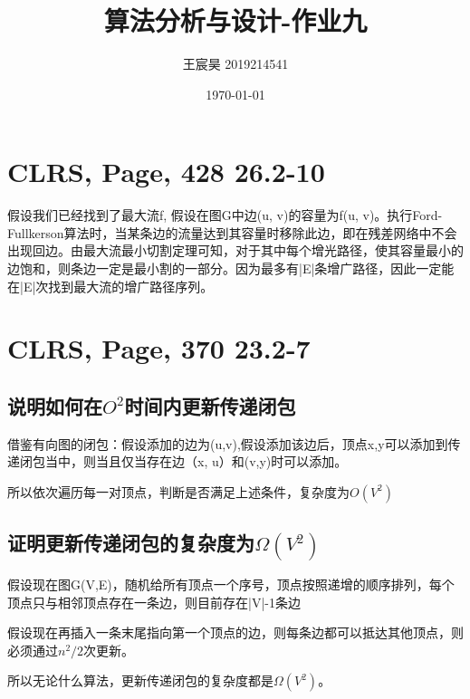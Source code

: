 \documentclass[UTF8]{ctexart}
\title{算法分析与设计-作业九}
\author{王宸昊 2019214541}
\date{\today}
\begin{document}
\maketitle


\section{CLRS, Page, 428 26.2-10}

假设我们已经找到了最大流f, 假设在图G中边(u, v)的容量为f(u, v)。执行Ford-Fullkerson算法时，当某条边的流量达到其容量时移除此边，即在残差网络中不会出现回边。由最大流最小切割定理可知，对于其中每个增光路径，使其容量最小的边饱和，则条边一定是最小割的一部分。因为最多有|E|条增广路径，因此一定能在|E|次找到最大流的增广路径序列。



\section{CLRS, Page, 370 23.2-7}

\subsection{说明如何在${O^2}$时间内更新传递闭包}

借鉴有向图的闭包：假设添加的边为(u,v),假设添加该边后，顶点x,y可以添加到传递闭包当中，则当且仅当存在边（x, u）和(v,y)时可以添加。

所以依次遍历每一对顶点，判断是否满足上述条件，复杂度为${O(V^2)}$


 \subsection{证明更新传递闭包的复杂度为$\Omega(V^2)$}

 假设现在图G(V,E)，随机给所有顶点一个序号，顶点按照递增的顺序排列，每个顶点只与相邻顶点存在一条边，则目前存在|V|-1条边

 假设现在再插入一条末尾指向第一个顶点的边，则每条边都可以抵达其他顶点，则必须通过$n^2 / 2$次更新。

 所以无论什么算法，更新传递闭包的复杂度都是$\Omega(V^2)$。
\end{document}
